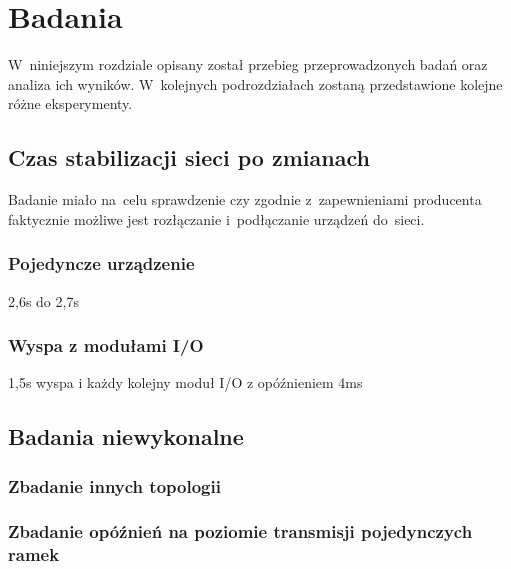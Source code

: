 \section{Badania}
W~niniejszym rozdziale opisany został przebieg przeprowadzonych badań oraz analiza ich wyników. W~kolejnych podrozdziałach zostaną przedstawione kolejne różne eksperymenty. 

\subsection{Czas stabilizacji sieci po zmianach}
Badanie miało na~celu sprawdzenie czy zgodnie z~zapewnieniami producenta faktycznie możliwe jest rozłączanie i~podłączanie urządzeń do~sieci.
\subsubsection{Pojedyncze urządzenie}
2,6s do 2,7s

\subsubsection{Wyspa z modułami I/O}
1,5s wyspa i każdy kolejny moduł I/O z opóźnieniem 4ms


\subsection{Badania niewykonalne}

\subsubsection{Zbadanie innych topologii}

\subsubsection{Zbadanie opóźnień na poziomie transmisji pojedynczych ramek}
%
%
%
%
